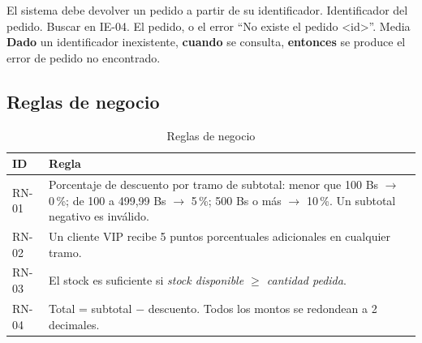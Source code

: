 \documentclass[11pt,a4paper,oneside]{report}
\begin{document}
{El sistema debe devolver un pedido a partir de su identificador.}
{Identificador del pedido.}
{Buscar en IE-04.}
{El pedido, o el error ``No existe el pedido <id>''.}
{Media}
{\textbf{Dado} un identificador inexistente, \textbf{cuando} se consulta, \textbf{entonces} se produce el error de pedido no encontrado.}

\subsection{Reglas de negocio}
\begin{table}[H]
\centering
\caption{Reglas de negocio}
\begin{tabularx}{\linewidth}{lX}
\toprule
\textbf{ID} & \textbf{Regla}\\
\midrule
RN-01 & Porcentaje de descuento por tramo de subtotal: menor que 100 Bs $\rightarrow$ 0\,\%; de 100 a 499,99 Bs $\rightarrow$ 5\,\%; 500 Bs o más $\rightarrow$ 10\,\%. Un subtotal negativo es inválido.\\
RN-02 & Un cliente VIP recibe 5 puntos porcentuales adicionales en cualquier tramo.\\
RN-03 & El stock es suficiente si \emph{stock disponible $\geq$ cantidad pedida}.\\
RN-04 & Total = subtotal $-$ descuento. Todos los montos se redondean a 2 decimales.\\
\bottomrule
\end{tabularx}
\end{table}
\end{document}
